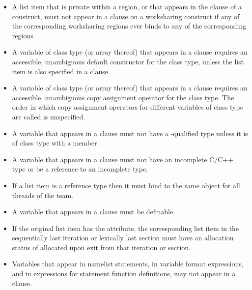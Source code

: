 \begin{itemize}
\item A list item that is private within a  region, or that appears in the 
 clause of a  construct, must not appear in a  
clause on a worksharing construct if any of the corresponding worksharing regions 
ever binds to any of the corresponding  regions.

\cppspecificstart
\item A variable of class type (or array thereof) that appears in a  clause 
requires an accessible, unambiguous default constructor for the class type, unless the 
list item is also specified in a  clause. 

\item A variable of class type (or array thereof) that appears in a  clause 
requires an accessible, unambiguous copy assignment operator for the class type. The 
order in which copy assignment operators for different variables of class type are 
called is unspecified.
\cppspecificend

\ccppspecificstart
\item A variable that appears in a  clause must not have a -qualified 
type unless it is of class type with a  member. 

\item A variable that appears in a  clause must not have an incomplete C/C++ type or be a reference to an incomplete type.
\item If a list item is a reference type then it must bind to the same object for all threads of the team. 
\ccppspecificend

\fortranspecificstart
\item A variable that appears in a  clause must be definable.

\item If the original list item has the  attribute, the corresponding list item in the sequentially last iteration or lexically last section must have an allocation status of allocated upon exit from that iteration or section.

\item Variables that appear in namelist statements, in variable format expressions, and in 
expressions for statement function definitions, may not appear in a  
clause.
\fortranspecificend
\end{itemize}










